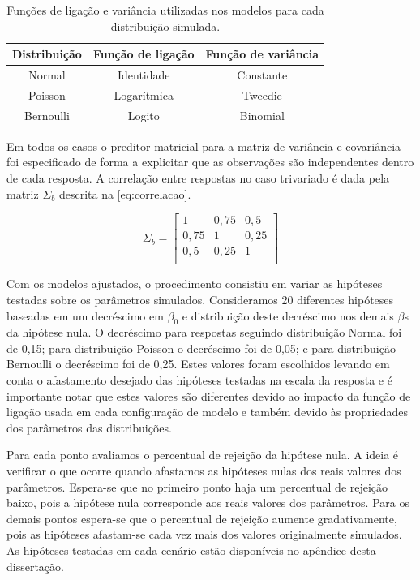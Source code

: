 \documentclass[AMA,STIX1COL]{WileyNJD-v2}
\begin{document}
\begin{table}[H]
\centering
\begin{tabular}{ccc}
\hline
Distribuição & Função de ligação & Função de variância \\ \hline
Normal       & Identidade        & Constante           \\
Poisson      & Logarítmica       & Tweedie             \\
Bernoulli    & Logito            & Binomial            \\ \hline
\end{tabular}
\caption{Funções de ligação e variância utilizadas nos modelos para cada distribuição simulada.}
\label{tab:link_var}
\end{table}

Em todos os casos o preditor matricial para a matriz de variância e covariância foi especificado de forma a explicitar que as observações são independentes dentro de cada resposta. A correlação entre respostas no caso trivariado é dada pela matriz $\Sigma_b$ descrita na \autoref{eq:correlacao}.

\begin{equation} \label{eq:correlacao}
\Sigma_b = 
\begin{bmatrix}
1    & 0,75 & 0,5  \\
0,75 & 1    & 0,25 \\
0,5  & 0,25 & 1    \\
\end{bmatrix}
\end{equation}

Com os modelos ajustados, o procedimento consistiu em variar as hipóteses testadas sobre os parâmetros simulados. Consideramos 20 diferentes hipóteses baseadas em um decréscimo em $\beta_0$ e distribuição deste decréscimo nos demais $\beta$s da hipótese nula. O decréscimo para respostas seguindo distribuição Normal foi de 0,15; para distribuição Poisson o decréscimo foi de 0,05; e para distribuição Bernoulli o decréscimo foi de 0,25. Estes valores foram escolhidos levando em conta o afastamento desejado das hipóteses testadas na escala da resposta e é importante notar que estes valores são diferentes devido ao impacto da função de ligação usada em cada configuração de modelo e também devido às propriedades dos parâmetros das distribuições.

Para cada ponto avaliamos o percentual de rejeição da hipótese nula. A ideia é verificar o que ocorre quando afastamos as hipóteses nulas dos reais valores dos parâmetros. Espera-se que no primeiro ponto haja um percentual de rejeição baixo, pois a hipótese nula corresponde aos reais valores dos parâmetros. Para os demais pontos espera-se que o percentual de rejeição aumente gradativamente, pois as hipóteses afastam-se cada vez mais dos valores originalmente simulados. As hipóteses testadas em cada cenário estão disponíveis no apêndice desta dissertação.
 
\end{document}
